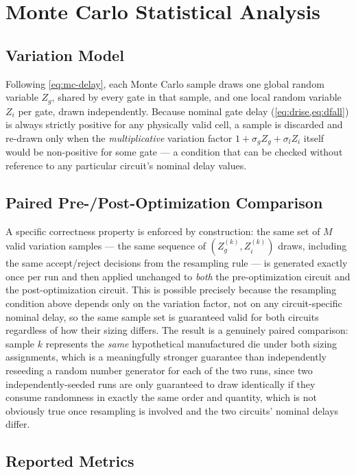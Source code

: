 \chapter{Monte Carlo Statistical Analysis}
\label{ch:monte-carlo}

\section{Variation Model}
\label{sec:mc-model}

Following \cref{eq:mc-delay}, each Monte Carlo sample draws one global
random variable $Z_g$, shared by every gate in that sample, and one local
random variable $Z_i$ per gate, drawn independently. Because nominal gate
delay (\cref{eq:drise,eq:dfall}) is always strictly positive for any
physically valid cell, a sample is discarded and re-drawn only when the
\emph{multiplicative} variation factor $1 + \sigma_g Z_g + \sigma_l Z_i$
itself would be non-positive for some gate --- a condition that can be
checked without reference to any particular circuit's nominal delay values.

\section{Paired Pre-/Post-Optimization Comparison}
\label{sec:mc-pairing}

A specific correctness property is enforced by construction: the same set
of $M$ valid variation samples --- the same sequence of $(Z_g^{(k)},
Z_i^{(k)})$ draws, including the same accept/reject decisions from the
resampling rule --- is generated exactly once per run and then applied
unchanged to \emph{both} the pre-optimization circuit and the
post-optimization circuit. This is possible precisely because the
resampling condition above depends only on the variation factor, not on
any circuit-specific nominal delay, so the same sample set is guaranteed
valid for both circuits regardless of how their sizing differs. The result
is a genuinely paired comparison: sample $k$ represents the \emph{same}
hypothetical manufactured die under both sizing assignments, which is a
meaningfully stronger guarantee than independently reseeding a random
number generator for each of the two runs, since two independently-seeded
runs are only guaranteed to draw identically if they consume randomness in
exactly the same order and quantity, which is not obviously true once
resampling is involved and the two circuits' nominal delays differ.

\section{Reported Metrics}
\label{sec:mc-metrics}

